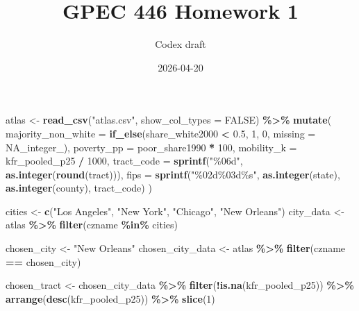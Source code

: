 \documentclass[
]{article}
\title{GPEC 446 Homework 1}
\author{Codex draft}
\date{2026-04-20}
\newenvironment{Shaded}{\begin{snugshade}}{\end{snugshade}}
\newcommand{\AttributeTok}[1]{\textcolor[rgb]{0.13,0.29,0.53}{#1}}
\newcommand{\ConstantTok}[1]{\textcolor[rgb]{0.56,0.35,0.01}{#1}}
\newcommand{\DecValTok}[1]{\textcolor[rgb]{0.00,0.00,0.81}{#1}}
\newcommand{\FloatTok}[1]{\textcolor[rgb]{0.00,0.00,0.81}{#1}}
\newcommand{\FunctionTok}[1]{\textcolor[rgb]{0.13,0.29,0.53}{\textbf{#1}}}
\newcommand{\NormalTok}[1]{#1}
\newcommand{\OtherTok}[1]{\textcolor[rgb]{0.56,0.35,0.01}{#1}}
\newcommand{\SpecialCharTok}[1]{\textcolor[rgb]{0.81,0.36,0.00}{\textbf{#1}}}
\newcommand{\StringTok}[1]{\textcolor[rgb]{0.31,0.60,0.02}{#1}}
\begin{document}
\maketitle

\begin{Shaded}
\begin{Highlighting}[]
\NormalTok{atlas }\OtherTok{\textless{}{-}} \FunctionTok{read\_csv}\NormalTok{(}\StringTok{"atlas.csv"}\NormalTok{, }\AttributeTok{show\_col\_types =} \ConstantTok{FALSE}\NormalTok{) }\SpecialCharTok{\%\textgreater{}\%}
  \FunctionTok{mutate}\NormalTok{(}
    \AttributeTok{majority\_non\_white =} \FunctionTok{if\_else}\NormalTok{(share\_white2000 }\SpecialCharTok{\textless{}} \FloatTok{0.5}\NormalTok{, }\DecValTok{1}\NormalTok{, }\DecValTok{0}\NormalTok{, }\AttributeTok{missing =} \ConstantTok{NA\_integer\_}\NormalTok{),}
    \AttributeTok{poverty\_pp =}\NormalTok{ poor\_share1990 }\SpecialCharTok{*} \DecValTok{100}\NormalTok{,}
    \AttributeTok{mobility\_k =}\NormalTok{ kfr\_pooled\_p25 }\SpecialCharTok{/} \DecValTok{1000}\NormalTok{,}
    \AttributeTok{tract\_code =} \FunctionTok{sprintf}\NormalTok{(}\StringTok{"\%06d"}\NormalTok{, }\FunctionTok{as.integer}\NormalTok{(}\FunctionTok{round}\NormalTok{(tract))),}
    \AttributeTok{fips =} \FunctionTok{sprintf}\NormalTok{(}\StringTok{"\%02d\%03d\%s"}\NormalTok{, }\FunctionTok{as.integer}\NormalTok{(state), }\FunctionTok{as.integer}\NormalTok{(county), tract\_code)}
\NormalTok{  )}

\NormalTok{cities }\OtherTok{\textless{}{-}} \FunctionTok{c}\NormalTok{(}\StringTok{"Los Angeles"}\NormalTok{, }\StringTok{"New York"}\NormalTok{, }\StringTok{"Chicago"}\NormalTok{, }\StringTok{"New Orleans"}\NormalTok{)}
\NormalTok{city\_data }\OtherTok{\textless{}{-}}\NormalTok{ atlas }\SpecialCharTok{\%\textgreater{}\%} \FunctionTok{filter}\NormalTok{(czname }\SpecialCharTok{\%in\%}\NormalTok{ cities)}

\NormalTok{chosen\_city }\OtherTok{\textless{}{-}} \StringTok{"New Orleans"}
\NormalTok{chosen\_city\_data }\OtherTok{\textless{}{-}}\NormalTok{ atlas }\SpecialCharTok{\%\textgreater{}\%} \FunctionTok{filter}\NormalTok{(czname }\SpecialCharTok{==}\NormalTok{ chosen\_city)}

\NormalTok{chosen\_tract }\OtherTok{\textless{}{-}}\NormalTok{ chosen\_city\_data }\SpecialCharTok{\%\textgreater{}\%}
  \FunctionTok{filter}\NormalTok{(}\SpecialCharTok{!}\FunctionTok{is.na}\NormalTok{(kfr\_pooled\_p25)) }\SpecialCharTok{\%\textgreater{}\%}
  \FunctionTok{arrange}\NormalTok{(}\FunctionTok{desc}\NormalTok{(kfr\_pooled\_p25)) }\SpecialCharTok{\%\textgreater{}\%}
  \FunctionTok{slice}\NormalTok{(}\DecValTok{1}\NormalTok{)}


\end{Highlighting}
\end{Shaded}
\end{document}
